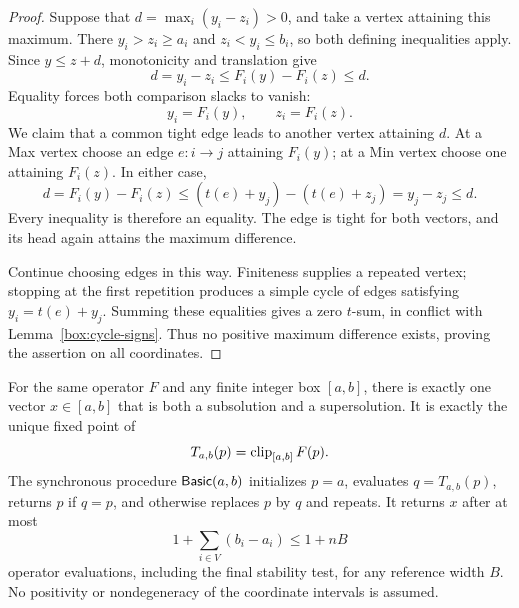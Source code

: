 \begin{proof}
Suppose that $d=\max_i(y_i-z_i)>0$, and take a vertex attaining this
maximum. There $y_i>z_i\ge a_i$ and $z_i<y_i\le b_i$, so both defining
inequalities apply. Since $y\le z+d$, monotonicity and translation give
\[
 d=y_i-z_i\le F_i(y)-F_i(z)\le d.
\]
Equality forces both comparison slacks to vanish:
\begin{equation}\label{box:comparison-equalities}
 y_i=F_i(y),\qquad z_i=F_i(z).
\end{equation}
We claim that a common tight edge leads to another vertex attaining $d$.
At a Max vertex choose an edge $e:i\to j$ attaining $F_i(y)$; at a Min
vertex choose one attaining $F_i(z)$. In either case,
\[
 d=F_i(y)-F_i(z)
 \le (t(e)+y_j)-(t(e)+z_j)=y_j-z_j\le d.
\]
Every inequality is therefore an equality. The edge is tight for both
vectors, and its head again attains the maximum difference.

Continue choosing edges in this way. Finiteness supplies a repeated
vertex; stopping at the first repetition produces a simple cycle of
edges satisfying $y_i=t(e)+y_j$. Summing these equalities gives a zero
$t$-sum, in conflict with Lemma~\ref{box:cycle-signs}. Thus no positive
maximum difference exists, proving the assertion on all coordinates.
\end{proof}

\begin{lemma}\label{lem:box-solution}
For the same operator $F$ and any finite integer box $[a,b]$, there is
exactly one vector $x\in[a,b]$ that is both a subsolution and a
supersolution. It is exactly the unique fixed point of
\[
 T_{a,b}(p)=\operatorname{clip}_{[a,b]}F(p).
\]
The synchronous procedure $\mathsf{Basic}(a,b)$ initializes $p=a$, evaluates
$q=T_{a,b}(p)$, returns $p$ if $q=p$, and otherwise replaces $p$ by $q$
and repeats. It returns $x$ after at most
\[
 1+\sum_{i\in V}(b_i-a_i)\le1+nB
\]
operator evaluations, including the final stability test, for any
reference width $B$. No positivity or nondegeneracy of the coordinate
intervals is assumed.
\end{lemma}

